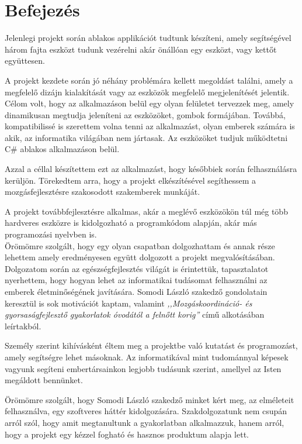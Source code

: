 \documentclass[tocnopagenum]{thesis-ekf}
\theoremstyle{definition}
\theoremstyle{remark}
\begin{document}
	\chapter*{Befejezés}
	Jelenlegi projekt során ablakos applikációt tudtunk készíteni, amely segítségével három fajta eszközt tudunk vezérelni akár önállóan egy eszközt, vagy kettőt együttesen.  
	\par
	A projekt kezdete során jó néhány problémára kellett megoldást találni, amely a megfelelő dizájn kialakítását vagy az eszközök megfelelő megjelenítését jelentik. Célom volt, hogy az alkalmazáson belül egy olyan felületet tervezzek meg, amely dinamikusan megtudja jeleníteni az eszközöket, gombok formájában. Továbbá, kompatibilissé is szerettem volna tenni az alkalmazást, olyan emberek számára is akik, az informatika világában nem jártasak. Az eszközöket tudjuk működtetni C\# ablakos alkalmazáson belül.
	\par
	Azzal a céllal készítettem ezt az alkalmazást, hogy későbbiek során felhasználásra kerüljön. Törekedtem arra, hogy a projekt elkészítésével segíthessem a mozgásfejlesztésre szakosodott szakemberek munkáját.
	\par
	A projekt továbbfejlesztésre alkalmas, akár a meglévő eszközökön túl még több hardveres eszközre is kidolgozható a programkódom alapján, akár más programozási nyelvben is.
	\\
	Örömömre szolgált, hogy egy olyan csapatban dolgozhattam és annak része lehettem amely eredményesen együtt dolgozott a projekt megvalósításában. Dolgozatom során az egészségfejlesztés világát is érintettük, tapasztalatot nyerhettem, hogy hogyan lehet az informatikai tudásomat felhasználni az emberek életminőségének javítására. Somodi László szakedző gondolatain keresztül is sok motivációt kaptam, valamint \textit{,,Mozgáskoordináció- és gyorsaságfejlesztő gyakorlatok óvodától a felnőtt korig''} című alkotásában leírtakból.
	
	Személy szerint kihívásként éltem meg a projektbe való kutatást és programozást, amely segítségre lehet másoknak. Az informatikával mint tudománnyal képesek vagyunk segíteni embertársainkon legjobb tudásunk szerint, amellyel az Isten megáldott bennünket.
	
	Örömömre szolgált, hogy Somodi László szakedző minket kért meg, az elméleteit felhasználva, egy szoftveres háttér kidolgozására. Szakdolgozatunk nem csupán arról szól, hogy amit megtanultunk a gyakorlatban alkalmazzuk, hanem arról, hogy a projekt egy kézzel fogható és hasznos produktum alapja lett.
	
\end{document}
